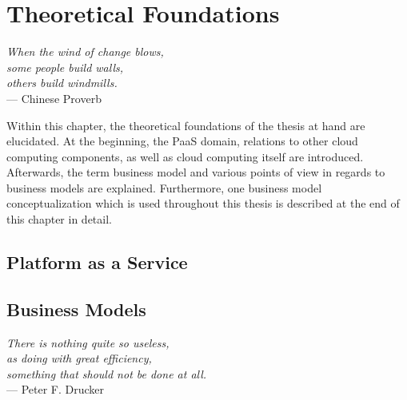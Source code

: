 \chapter{Theoretical Foundations}\label{ch:tf}

	\begin{flushright}{\slshape    
    When the wind of change blows,\\
		some people build walls,\\
		others build windmills.} \\ \medskip
    --- Chinese Proverb
	\end{flushright}

Within this chapter, the theoretical foundations of the thesis at hand are elucidated. At the beginning, the \ac{PaaS} domain, relations to other cloud computing components, as well as cloud computing itself are introduced. Afterwards, the term business model and various points of view in regards to business models are explained. Furthermore, one business model conceptualization which is used throughout this thesis is described at the end of this chapter in detail. 

\section{Platform as a Service}\label{ch:tf:paas}

\section{Business Models}\label{ch:tf:bm}

\begin{flushright}{\slshape    
	There is nothing quite so useless,\\
	as doing with great efficiency, \\
	something that should not be done at all.} \\ \medskip
	--- Peter F. Drucker
\end{flushright}

